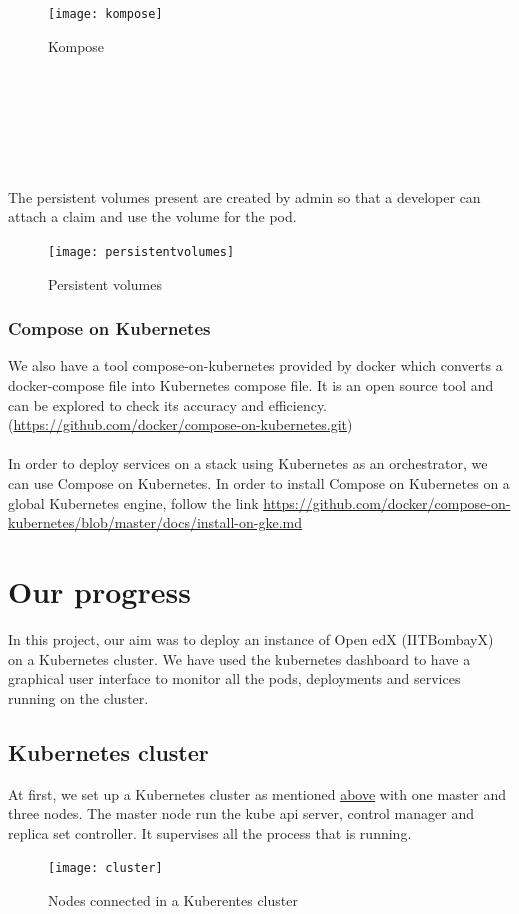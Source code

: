 \documentclass[12pt]{report}
\begin{document}
\begin{figure}[h!]
	\begin{center}
		\texttt{[image: kompose]}
		\caption{Kompose \cite{Kompose}}
	\end{center}
\end{figure}\\\\\\\\\\
\\The persistent volumes present are created by admin so that a developer can attach a claim and use the volume for the pod.
\begin{figure}[h!]
	\begin{center}
		\texttt{[image: persistentvolumes]}
		\caption{Persistent volumes \cite{Persistent}}
	\end{center}
\end{figure}
\subsection{Compose on Kubernetes}
We also have a tool compose-on-kubernetes provided by docker which converts a docker-compose file into Kubernetes compose file. It is an open source tool and can be explored to check its accuracy and efficiency.(\href{https://github.com/docker/compose-on-kubernetes.git}{https://github.com/docker/compose-on-kubernetes.git})\cite{Compose}\\\\
In order to deploy services on a stack using Kubernetes as an orchestrator, we can use Compose on Kubernetes. In order to install Compose on Kubernetes on a global Kubernetes engine, follow the link \url{https://github.com/docker/compose-on-kubernetes/blob/master/docs/install-on-gke.md}\cite{Compinst}
\chapter{Our progress}
In this project, our aim was to deploy an instance of Open edX (IITBombayX) on a Kubernetes cluster. We have used the kubernetes dashboard to have a graphical user interface to monitor all the pods, deployments and services running on the cluster. 
\section{Kubernetes cluster}
At first, we set up a Kubernetes cluster as mentioned \hyperref[sec:kubeclustset]{above} with one master and three nodes. The master node run the kube api server, control manager and replica set controller. It supervises all the process that is running.
\begin{figure}[h!]
	\begin{center}
		\texttt{[image: cluster]}
		\caption{Nodes connected in a Kuberentes cluster}
	\end{center}
\end{figure}
\\\\\\
\end{document}
